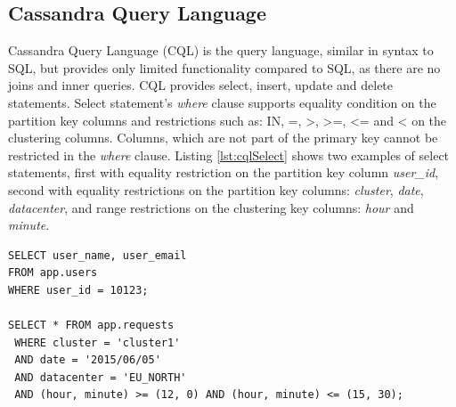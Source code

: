 

\subsection{Cassandra Query Language}
\label{sec:theory:cassandra:cql}
Cassandra Query Language (CQL) is the query language, similar in syntax to SQL, but provides only limited functionality compared to SQL, as there are no joins and inner queries. CQL provides select, insert, update and delete statements. Select statement's \emph{where} clause supports equality condition on the partition key columns and restrictions such as: IN, =, >, >=, <= and < on the clustering columns. Columns, which are not part of the primary key cannot be restricted in the \emph{where} clause. Listing \ref{lst:cqlSelect} shows two examples of select statements, first with equality restriction on the partition key column \emph{user_id}, second with equality restrictions on the partition key columns: \emph{cluster}, \emph{date}, \emph{datacenter}, and range restrictions on the clustering key columns: \emph{hour} and \emph{minute}.

\begin{lstlisting}[style=outcode,label={lst:cqlSelect},caption={Examples of CQL select statements}]
SELECT user_name, user_email 
FROM app.users 
WHERE user_id = 10123;
    
SELECT * FROM app.requests
 WHERE cluster = 'cluster1'
 AND date = '2015/06/05'
 AND datacenter = 'EU_NORTH'
 AND (hour, minute) >= (12, 0) AND (hour, minute) <= (15, 30);
\end{lstlisting}

 

